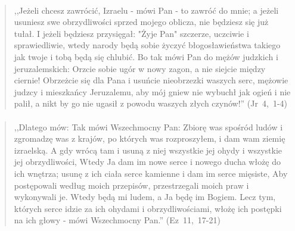 \documentclass[10pt,a4paper,oneside]{article}
\begin{document}
\paragraph{}
\begin{quote}
,,Jeżeli chcesz zawrócić, Izraelu - mówi Pan - to zawróć do mnie; a jeżeli usuniesz swe obrzydliwości sprzed mojego oblicza, nie będziesz się już tułał. I jeżeli będziesz przysięgał: "Żyje Pan" szczerze, uczciwie i sprawiedliwie, wtedy narody będą sobie życzyć błogosławieństwa takiego jak twoje i tobą będą się chlubić. Bo tak mówi Pan do mężów judzkich i jeruzalemskich: Orzcie sobie ugór w nowy zagon, a nie siejcie między ciernie! Obrzeżcie się dla Pana i usuńcie nieobrzezki waszych serc, mężowie judzcy i mieszkańcy Jeruzalemu, aby mój gniew nie wybuchł jak ogień i nie palił, a nikt by go nie ugasił z powodu waszych złych czynów!'' \mbox{(Jr 4, 1-4)}
\end{quote}
\paragraph{}
\begin{quote}
,,Dlatego mów: Tak mówi Wszechmocny Pan: Zbiorę was spośród ludów i zgromadzę was z krajów, po których was rozproszyłem, i dam wam ziemię izraelską. A gdy wrócą tam i usuną z niej wszystkie jej ohydy i wszystkie jej obrzydliwości, Wtedy Ja dam im nowe serce i nowego ducha włożę do ich wnętrza; usunę z ich ciała serce kamienne i dam im serce mięsiste, Aby postępowali według moich przepisów, przestrzegali moich praw i wykonywali je. Wtedy będą mi ludem, a Ja będę im Bogiem. Lecz tym, których serce idzie za ich ohydami i obrzydliwościami, włożę ich postępki na ich głowy - mówi Wszechmocny Pan.'' \mbox{(Ez 11, 17-21)}
\end{quote}
\end{document}
